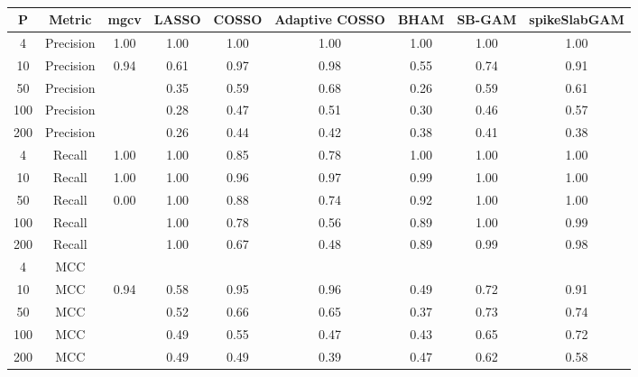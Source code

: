 \begin{table}[ht]
\centering
\begin{tabular}{ccccccccc}
  \hline
P & Metric & mgcv & LASSO & COSSO & Adaptive COSSO & BHAM & SB-GAM & spikeSlabGAM \\ 
  \hline
  4 & Precision & 1.00 & 1.00 & 1.00 & 1.00 & 1.00 & 1.00 & 1.00 \\ 
   10 & Precision & 0.94 & 0.61 & 0.97 & 0.98 & 0.55 & 0.74 & 0.91 \\ 
   50 & Precision &  & 0.35 & 0.59 & 0.68 & 0.26 & 0.59 & 0.61 \\ 
  100 & Precision &  & 0.28 & 0.47 & 0.51 & 0.30 & 0.46 & 0.57 \\ 
  200 & Precision &  & 0.26 & 0.44 & 0.42 & 0.38 & 0.41 & 0.38 \\ 
    4 & Recall & 1.00 & 1.00 & 0.85 & 0.78 & 1.00 & 1.00 & 1.00 \\ 
   10 & Recall & 1.00 & 1.00 & 0.96 & 0.97 & 0.99 & 1.00 & 1.00 \\ 
   50 & Recall & 0.00 & 1.00 & 0.88 & 0.74 & 0.92 & 1.00 & 1.00 \\ 
  100 & Recall &  & 1.00 & 0.78 & 0.56 & 0.89 & 1.00 & 0.99 \\ 
  200 & Recall &  & 1.00 & 0.67 & 0.48 & 0.89 & 0.99 & 0.98 \\ 
    4 & MCC &  &  &  &  &  &  &  \\ 
   10 & MCC & 0.94 & 0.58 & 0.95 & 0.96 & 0.49 & 0.72 & 0.91 \\ 
   50 & MCC &  & 0.52 & 0.66 & 0.65 & 0.37 & 0.73 & 0.74 \\ 
  100 & MCC &  & 0.49 & 0.55 & 0.47 & 0.43 & 0.65 & 0.72 \\ 
  200 & MCC &  & 0.49 & 0.49 & 0.39 & 0.47 & 0.62 & 0.58 \\ 
   \hline
\end{tabular}
\caption{} 
\label{}
\end{table}
